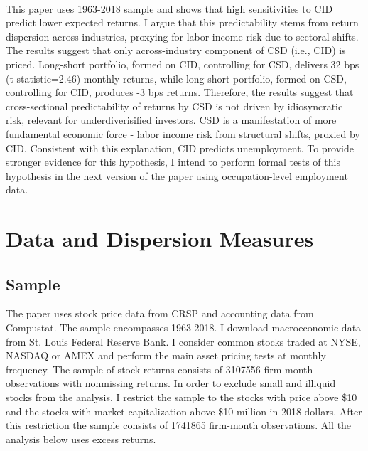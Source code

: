 \documentclass[12pt]{article}
\begin{document}
\paragraph{}
This paper uses 1963-2018 sample and shows that high sensitivities to CID predict lower expected returns. I argue that this predictability stems from return dispersion across industries, proxying for labor income risk due to sectoral shifts. The results suggest that only across-industry component of CSD (i.e., CID) is priced. Long-short portfolio, formed on CID, controlling for CSD, delivers 32 bps (t-statistic=2.46) monthly returns, while long-short portfolio, formed on CSD, controlling for CID, produces -3 bps returns. Therefore, the results suggest that cross-sectional predictability of returns by CSD is not driven by idiosyncratic risk, relevant for underdiverisified investors. CSD is a manifestation of more fundamental economic force - labor income risk from structural shifts, proxied by CID. Consistent with this explanation, CID predicts unemployment. To provide stronger evidence for this hypothesis, I intend to perform formal tests of this hypothesis in the next version of the paper using occupation-level employment data.


\section{Data and Dispersion Measures} \label{sec:Model}

\subsection{Sample}

The paper uses stock price data from CRSP and accounting data from Compustat. The sample encompasses 1963-2018. I download macroeconomic data from St. Louis Federal Reserve Bank. 
I consider common stocks traded at NYSE, NASDAQ or AMEX and perform the main asset pricing tests at monthly frequency. The sample of stock returns consists of 3107556 firm-month observations with nonmissing returns. In order to exclude small and illiquid stocks from the analysis, I restrict the sample to the stocks with price above \$10 and the stocks with market capitalization above \$10 million in 2018 dollars. After this restriction the sample consists of 1741865 firm-month observations. All the analysis below uses excess returns.
\end{document}
